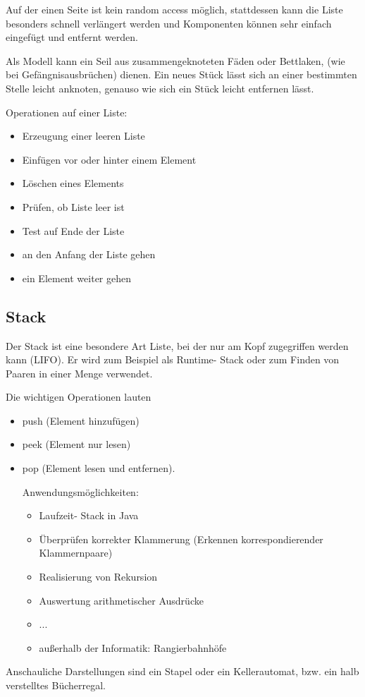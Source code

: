 \documentclass[fleqn]{scrartcl}
\begin{document}
Auf der einen Seite ist kein random access möglich, stattdessen kann die Liste besonders schnell verlängert werden und Komponenten können sehr einfach eingefügt und entfernt werden.

Als Modell kann ein Seil aus zusammengeknoteten Fäden oder Bettlaken, (wie bei Gefängnisausbrüchen) dienen. Ein neues Stück lässt sich an einer bestimmten Stelle leicht anknoten, genauso wie sich ein Stück leicht entfernen lässt.

Operationen auf einer Liste:
\begin{itemize}
\item Erzeugung einer leeren Liste
\item Einfügen vor oder hinter einem Element
\item Löschen eines Elements
\item Prüfen, ob Liste leer ist
\item Test auf Ende der Liste
\item an den Anfang der Liste gehen
\item ein Element weiter gehen
\end{itemize}
\subsection{Stack}
Der Stack ist eine besondere Art Liste, bei der nur am Kopf zugegriffen werden kann (LIFO).
Er wird zum Beispiel als Runtime- Stack oder zum Finden von Paaren in einer Menge verwendet.

Die wichtigen Operationen lauten 
\begin{itemize}
\item push (Element hinzufügen)
\item peek (Element nur lesen)
\item pop (Element lesen und entfernen).

Anwendungsmöglichkeiten:
\begin{itemize}
\item Laufzeit- Stack in Java
\item Überprüfen korrekter Klammerung (Erkennen korrespondierender Klammernpaare)
\item Realisierung von Rekursion
\item Auswertung arithmetischer Ausdrücke
\item ...
\item außerhalb der Informatik: Rangierbahnhöfe
\end{itemize}
\end{itemize}
Anschauliche Darstellungen sind ein Stapel oder ein Kellerautomat, bzw. ein halb verstelltes Bücherregal.
\end{document}
